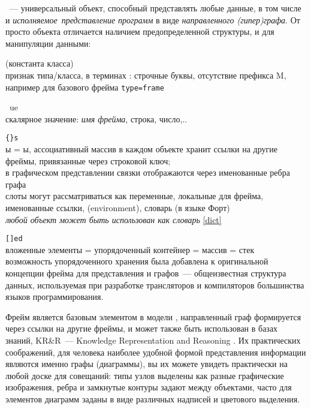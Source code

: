 \clearpage
{}\label{frame}\secdown

\ --- универсальный объект, способный представлять любые данные,
в том числе и \emph{исполняемое\ представление
программ} в виде \textit{направленного (гипер)графа}. От просто объекта отличается
наличием предопределенной структуры, и  для
манипуляции данными:

\begin{description}

    \item{} (константа класса)\\ признак типа/класса, в терминах \met: строчные буквы,
    отсутствие префикса M, например для базового фрейма \verb|type=frame|

    \item{}\ ue\\ скалярное значение: \textit{имя фрейма}, строка, число,..

\end{description}
\begin{description}[nosep]

    \item{}\verb|{}s|\\ ы = ы, ассоциативный массив в каждом объекте
    хранит ссылки на другие фреймы, привязанные через строковой ключ;\\
    в графическом представлении связки отображаются через именованные ребра графа\\
    слоты могут рассматриваться как переменные, локальные для фрейма, именованные ссылки,
     (environment), словарь (в языке Форт)\\
    \textit{любой объект может быть использован как словарь} \ref{dict}

    \item{}\verb|[]ed|\\ вложенные элементы = упорядоченный контейнер = массив = стек\\
    возможность упорядоченного хранения была добавлена к оригинальной концепции фрейма \cite{minsky}
    для представления  и графов\ --- общеизвестная структура данных,
    используемая при разработке трансляторов и компиляторов большинства языков программирования. 
    
\end{description}

Фрейм является базовым элементом в модели \met, направленный граф формируется через ссылки на другие фреймы,
и может также быть использован в базах знаний, KR\&R\ --- Knowledge Rep\-resen\-tation and Rea\-so\-ning \cite{minsky}.
Их практических соображений, для человека наиболее удобной формой представления информации являются именно графы (диаграммы),
вы их можете увидеть практически на любой доске для совещаний: типы узлов выделены как разные графические изображения,
ребра и замкнутые контуры задают  между объектами, часто для элементов диаграмм заданы  в виде
различных надписей и цветового выделения.

\secup

